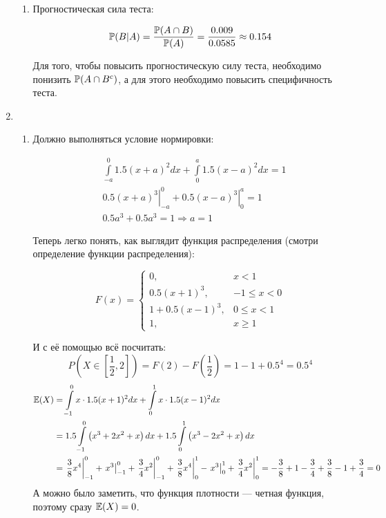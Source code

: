 \begin{enumerate}
\begin{enumerate}
\item Прогностическая сила теста:

\[
\P(B | A) = \frac{\P(A \cap B)}{\P(A) } = \frac{0.009}{0.0585} \approx 0.154
\]

Для того, чтобы повысить прогностическую силу теста, необходимо понизить
$\P(A \cap B^c) $, а для этого необходимо повысить специфичность теста.
\end{enumerate}

\item
\begin{enumerate}
\item
Должно выполняться условие нормировки:

\begin{align*}
& \int \limits_{-a}^0 1.5(x+a)^2 dx + \int \limits_0^a 1.5(x- a)^2  dx = 1   \\
& \left. 0.5(x+a)^3 \right|_{-a}^0 + \left. 0.5(x- a)^3 \right|_0^a  = 1  \\
& 0.5a^3 + 0.5a^3 = 1 \Rightarrow a = 1
\end{align*}

Теперь легко понять, как выглядит функция распределения (смотри определение функции распределения):

\[
F(x) = \begin{cases}
0, & x < 1 \\
0.5 (x+1)^3, & -1 \leqslant x <0 \\
1 + 0.5 (x-1)^3, & 0 \leqslant x < 1 \\
1, & x \geqslant 1
\end{cases}
\]

И с её помощью всё посчитать:
\[
P\left(X \in \left[\frac{1}{2}, 2 \right]  \right) = F(2) - F\left(\frac{1}{2} \right) =
1 - 1 +0.5^4 = 0.5^4
\]
\begin{align*}
\E(X) &= \int \limits_{-1}^0 x \cdot 1.5 (x + 1)^2 dx +  \int \limits_0^1 x \cdot 1.5 (x - 1)^2 dx \\
& = 1.5 \int \limits_{-1}^0\left( x^3 + 2x^2 + x\right) dx + 1.5 \int \limits_0^1\left( x^3 -2x^2 + x\right) dx \\
& =  \left. \frac{3}{8} x^4 \right|_{-1}^0 + \left. x^3 \right|_{-1}^0 +
\left. \frac{3}{4} x^2\right|_{-1}^0 + \left. \frac{3}{8} x^4 \right|_0^1 -
\left. x^3 \right|_0^1 + \left. \frac{3}{4} x^2 \right|_0^1  = - \frac{3}{8} +
1 - \frac{3}{4} + \frac{3}{8} - 1 +\frac{3}{4} = 0
\end{align*}
А можно было заметить, что функция плотности — четная функция, поэтому сразу $\E(X) = 0$.


\end{enumerate}
\end{enumerate}
